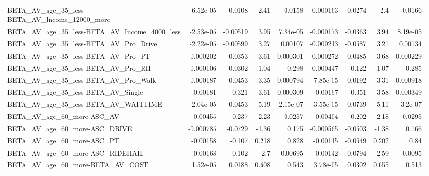 \begin{tabular}{lrrrrrrrr}
BETA\_AV\_age\_35\_less-BETA\_AV\_Income\_12000\_more      &    6.52e-05 &       0.0108 &      2.41 &   0.0158 &  -0.000163 &     -0.0274 &          2.4 &        0.0166 \\
BETA\_AV\_age\_35\_less-BETA\_AV\_Income\_4000\_less       &   -2.53e-05 &     -0.00519 &      3.95 & 7.84e-05 &  -0.000173 &     -0.0363 &         3.94 &      8.19e-05 \\
BETA\_AV\_age\_35\_less-BETA\_AV\_Pro\_Drive              &   -2.22e-05 &     -0.00599 &      3.27 &  0.00107 &  -0.000213 &     -0.0587 &         3.21 &       0.00134 \\
BETA\_AV\_age\_35\_less-BETA\_AV\_Pro\_PT                 &    0.000202 &       0.0353 &      3.61 & 0.000301 &   0.000272 &      0.0485 &         3.68 &      0.000229 \\
BETA\_AV\_age\_35\_less-BETA\_AV\_Pro\_RH                 &    0.000106 &       0.0302 &     -1.04 &    0.298 &   0.000447 &       0.122 &        -1.07 &         0.285 \\
BETA\_AV\_age\_35\_less-BETA\_AV\_Pro\_Walk               &    0.000187 &       0.0453 &      3.35 & 0.000794 &   7.85e-05 &      0.0192 &         3.31 &      0.000918 \\
BETA\_AV\_age\_35\_less-BETA\_AV\_Single                 &    -0.00181 &       -0.321 &      3.61 & 0.000309 &   -0.00197 &      -0.351 &         3.58 &      0.000349 \\
BETA\_AV\_age\_35\_less-BETA\_AV\_WAITTIME               &   -2.04e-05 &      -0.0453 &      5.19 & 2.15e-07 &  -3.55e-05 &     -0.0739 &         5.11 &       3.2e-07 \\
BETA\_AV\_age\_60\_more-ASC\_AV                         &    -0.00455 &       -0.237 &      2.23 &   0.0257 &   -0.00404 &      -0.202 &         2.18 &        0.0295 \\
BETA\_AV\_age\_60\_more-ASC\_DRIVE                      &   -0.000785 &      -0.0729 &     -1.36 &    0.175 &  -0.000565 &     -0.0503 &        -1.38 &         0.166 \\
BETA\_AV\_age\_60\_more-ASC\_PT                         &    -0.00158 &       -0.107 &     0.218 &    0.828 &   -0.00115 &     -0.0649 &        0.202 &          0.84 \\
BETA\_AV\_age\_60\_more-ASC\_RIDEHAIL                   &    -0.00168 &       -0.102 &       2.7 &  0.00695 &   -0.00142 &     -0.0794 &         2.59 &        0.0095 \\
BETA\_AV\_age\_60\_more-BETA\_AV\_COST                   &    1.52e-05 &       0.0188 &     0.608 &    0.543 &   3.78e-05 &      0.0302 &        0.655 &         0.513 \\

\end{tabular}
